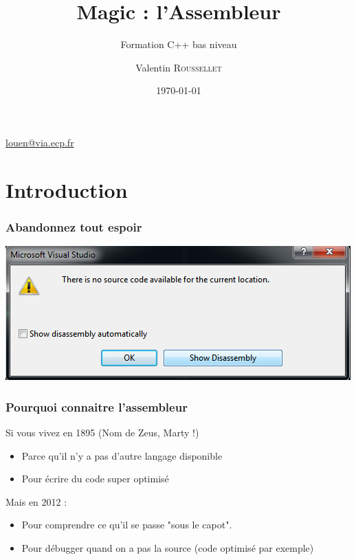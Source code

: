 \documentclass{beamer}
\title{Magic : l'Assembleur}
\subtitle{Formation C++ bas niveau}
\author{Valentin \textsc{Roussellet}}
\institute[VIA]{Centrale Reseaux}
\date{\today}
\begin{document}
\begin{frame}
  \titlepage
\begin{center}
\href{mailto:louen@via.ecp.fr}{louen@via.ecp.fr}
\end{center}
\end{frame}
\section*{Introduction}
\begin{frame}
    \frametitle{Abandonnez tout espoir}
    \begin{center}
\includegraphics[scale=0.5]{disass.png}
\end{center}
\end{frame}

\begin{frame}
    \frametitle{Pourquoi connaitre l'assembleur}
Si vous vivez en 1895 (Nom de Zeus, Marty !)
\begin{itemize}
 \item Parce qu'il n'y a pas d'autre langage disponible
 \item Pour écrire du code super optimisé 
\end{itemize}
\pause
Mais en 2012 :
\begin{itemize}
 \item Pour comprendre ce qu'il se passe "sous le capot".
 \item Pour débugger quand on a pas la source (code optimisé par exemple)
\end{itemize}
\end{frame}
\end{document}
